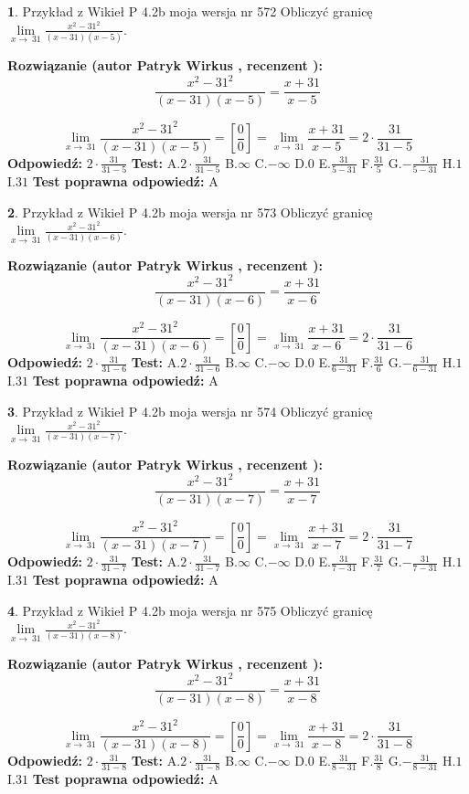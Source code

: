 \documentclass[12pt, a4paper]{article}
\theoremstyle{definition} %
\newtheorem{zad}{}
\newcommand{\zadStart}[1]{\begin{zad}#1\newline}
\newcommand{\zadStop}{\end{zad}}
\newcommand{\rozwStart}[2]{\noindent \textbf{Rozwiązanie (autor #1 , recenzent #2): }\newline}
\newcommand{\rozwStop}{\newline}
\newcommand{\odpStart}{\noindent \textbf{Odpowiedź:}\newline}
\newcommand{\odpStop}{\newline}
\newcommand{\testStart}{\noindent \textbf{Test:}\newline}
\newcommand{\testStop}{\newline}
\newcommand{\kluczStart}{\noindent \textbf{Test poprawna odpowiedź:}\newline}
\newcommand{\kluczStop}{\newline}
\begin{document}
\zadStart{Przykład z Wikieł P 4.2b moja wersja nr 572}
Obliczyć granicę $\lim\limits_{x\to\ 31}\frac{x^{2}-31^{2}}{(x-31)(x-5)}$.
\zadStop
\rozwStart{Patryk Wirkus}{}
$$\frac{x^{2}-31^{2}}{(x-31)(x-5)}=\frac{x+31}{x-5}$$

$$\lim\limits_{x\to\ 31}\frac{x^{2}-31^{2}}{(x-31)(x-5)}=[\frac{0}{0}]=\lim\limits_{x\to\ 31}\frac{x+31}{x-5}=2 \cdot \frac{31}{31-5}$$
\rozwStop
\odpStart
$2 \cdot \frac{31}{31-5}$
\odpStop
\testStart
A.$2 \cdot \frac{31}{31-5}$
B.$\infty$
C.$-\infty$
D.$0$
E.$\frac{31}{5-31}$
F.$\frac{31}{5}$
G.$-\frac{31}{5-31}$
H.$1$
I.$31$
\testStop
\kluczStart
A
\kluczStop



\zadStart{Przykład z Wikieł P 4.2b moja wersja nr 573}
Obliczyć granicę $\lim\limits_{x\to\ 31}\frac{x^{2}-31^{2}}{(x-31)(x-6)}$.
\zadStop
\rozwStart{Patryk Wirkus}{}
$$\frac{x^{2}-31^{2}}{(x-31)(x-6)}=\frac{x+31}{x-6}$$

$$\lim\limits_{x\to\ 31}\frac{x^{2}-31^{2}}{(x-31)(x-6)}=[\frac{0}{0}]=\lim\limits_{x\to\ 31}\frac{x+31}{x-6}=2 \cdot \frac{31}{31-6}$$
\rozwStop
\odpStart
$2 \cdot \frac{31}{31-6}$
\odpStop
\testStart
A.$2 \cdot \frac{31}{31-6}$
B.$\infty$
C.$-\infty$
D.$0$
E.$\frac{31}{6-31}$
F.$\frac{31}{6}$
G.$-\frac{31}{6-31}$
H.$1$
I.$31$
\testStop
\kluczStart
A
\kluczStop



\zadStart{Przykład z Wikieł P 4.2b moja wersja nr 574}
Obliczyć granicę $\lim\limits_{x\to\ 31}\frac{x^{2}-31^{2}}{(x-31)(x-7)}$.
\zadStop
\rozwStart{Patryk Wirkus}{}
$$\frac{x^{2}-31^{2}}{(x-31)(x-7)}=\frac{x+31}{x-7}$$

$$\lim\limits_{x\to\ 31}\frac{x^{2}-31^{2}}{(x-31)(x-7)}=[\frac{0}{0}]=\lim\limits_{x\to\ 31}\frac{x+31}{x-7}=2 \cdot \frac{31}{31-7}$$
\rozwStop
\odpStart
$2 \cdot \frac{31}{31-7}$
\odpStop
\testStart
A.$2 \cdot \frac{31}{31-7}$
B.$\infty$
C.$-\infty$
D.$0$
E.$\frac{31}{7-31}$
F.$\frac{31}{7}$
G.$-\frac{31}{7-31}$
H.$1$
I.$31$
\testStop
\kluczStart
A
\kluczStop



\zadStart{Przykład z Wikieł P 4.2b moja wersja nr 575}
Obliczyć granicę $\lim\limits_{x\to\ 31}\frac{x^{2}-31^{2}}{(x-31)(x-8)}$.
\zadStop
\rozwStart{Patryk Wirkus}{}
$$\frac{x^{2}-31^{2}}{(x-31)(x-8)}=\frac{x+31}{x-8}$$

$$\lim\limits_{x\to\ 31}\frac{x^{2}-31^{2}}{(x-31)(x-8)}=[\frac{0}{0}]=\lim\limits_{x\to\ 31}\frac{x+31}{x-8}=2 \cdot \frac{31}{31-8}$$
\rozwStop
\odpStart
$2 \cdot \frac{31}{31-8}$
\odpStop
\testStart
A.$2 \cdot \frac{31}{31-8}$
B.$\infty$
C.$-\infty$
D.$0$
E.$\frac{31}{8-31}$
F.$\frac{31}{8}$
G.$-\frac{31}{8-31}$
H.$1$
I.$31$
\testStop
\kluczStart
A
\kluczStop
\end{document}
